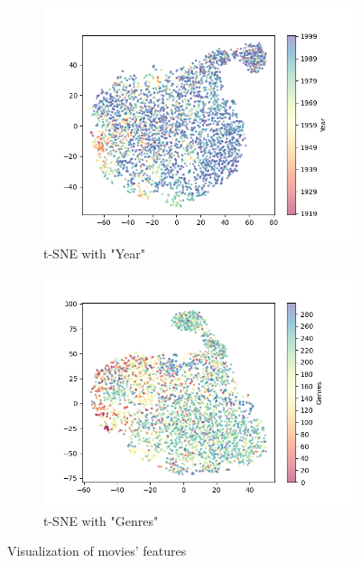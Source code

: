 \documentclass{article}
\begin{document}
\begin{figure}[H]
    \begin{subfigure}{0.49\textwidth}
        \includegraphics[width=\textwidth]{fig/tsne_year.png}
        \caption{t-SNE with "Year"}
    \end{subfigure}
    \begin{subfigure}{0.49\textwidth}
        \includegraphics[width=\textwidth]{fig/tsne_genres.png}
        \caption{t-SNE with "Genres"}
    \end{subfigure}
    \caption{Visualization of movies' features}
\end{figure}
\end{document}

